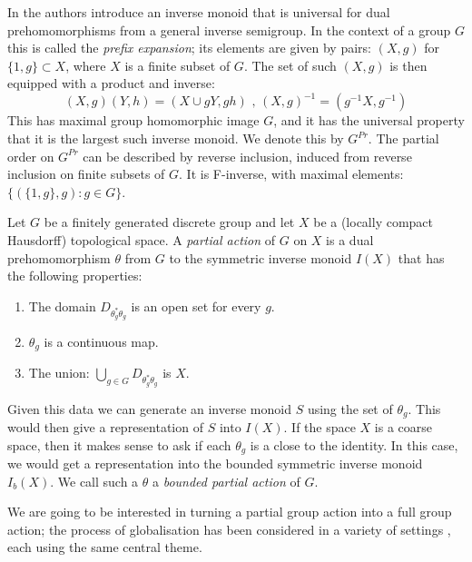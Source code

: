 \begin{example}
In \cite{MR745358,MR2221438} the authors introduce an inverse monoid that is universal for dual prehomomorphisms from a general inverse semigroup. In the context of a group $G$ this is called the \textit{prefix expansion}; its elements are given by pairs: $(X,g)$ for $\lbrace 1,g\rbrace \subset X$, where $X$ is a finite subset of $G$. The set of such $(X,g)$ is then equipped with a product and inverse:
\begin{equation*}
(X,g)(Y,h) = (X\cup gY,gh)\mbox{ , } (X,g)^{-1}=(g^{-1}X,g^{-1})
\end{equation*}
This has maximal group homomorphic image $G$, and it has the universal property that it is the largest such inverse monoid. We denote this by $G^{Pr}$. The partial order on $G^{Pr}$ can be described by reverse inclusion, induced from reverse inclusion on finite subsets of $G$. It is F-inverse, with maximal elements: $\lbrace(\lbrace 1,g \rbrace, g):g \in G \rbrace$.
\end{example}

\begin{definition}
Let $G$ be a finitely generated discrete group and let $X$ be a (locally compact Hausdorff) topological space. A \textit{partial action} of $G$ on $X$ is a dual prehomomorphism $\theta$ from $G$ to the symmetric inverse monoid $I(X)$ that has the following properties:
\begin{enumerate}
\item The domain $D_{\theta_{g}^{*}\theta_{g}}$ is an open set for every $g$.
\item $\theta_{g}$ is a continuous map.
\item The union: $\bigcup_{g \in G}D_{\theta_{g}^{*}\theta_{g}}$ is $X$.
\end{enumerate}
\end{definition}

Given this data we can generate an inverse monoid $S$ using the set of $\theta_{g}$. This would then give a representation of $S$ into $I(X)$. If the space $X$ is a coarse space, then it makes sense to ask if each $\theta_{g}$ is a close to the identity. In this case, we would get a representation into the bounded symmetric inverse monoid $I_{b}(X)$. We call such a $\theta$ a \textit{bounded partial action} of $G$.

We are going to be interested in turning a partial group action into a full group action; the process of globalisation has been considered in a variety of settings \cite{MR0160848, MR1798993, MR2041539, MR2419858, MR1900993, Milan-Steinberg}, each using the same central theme.

